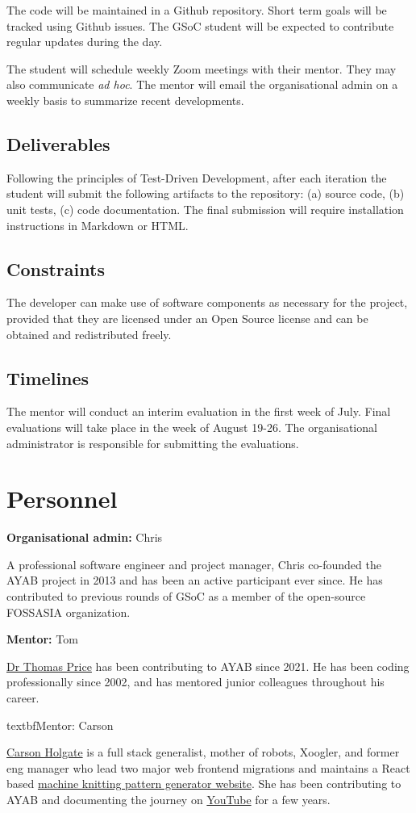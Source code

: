 \documentclass{article}
\begin{document}
The code will be maintained in a Github repository. Short term goals will be tracked using Github issues. The GSoC student will be expected to contribute regular updates during the day.

The student will schedule weekly Zoom meetings with their mentor. They may also communicate \textit{ad hoc}. The mentor will email the organisational admin on a weekly basis to summarize recent developments.

\subsection{Deliverables}
Following the principles of Test-Driven Development, after each iteration the student will submit the following artifacts to the repository: (a) source code, (b) unit tests, (c) code documentation. The final submission will require installation instructions in Markdown or HTML.

\subsection{Constraints}
The developer can make use of software components as necessary for the project, provided that they are licensed under an Open Source license and can be obtained and redistributed freely.

\subsection{Timelines}
The mentor will conduct an interim evaluation in the first week of July. Final evaluations will take place in the week of August 19-26. The organisational administrator is responsible for submitting the evaluations.


\section{Personnel}

\textbf{Organisational admin:} Chris

A professional software engineer and project manager, Chris co-founded the AYAB project in 2013 and has been an active participant ever since. He has contributed to previous rounds of GSoC as a member of the open-source FOSSASIA organization.

\textbf{Mentor:} Tom

\href{https://t0mpr1c3.github.io/}{Dr Thomas Price} has been contributing to AYAB since 2021. He has been coding professionally since 2002, and has mentored junior colleagues throughout his career.

textbf{Mentor:} Carson

\href{https://www.linkedin.com/in/carson-holgate/}{Carson Holgate} is a full stack generalist, mother of robots, Xoogler, and former eng manager who lead two major web frontend migrations and maintains a React based \href{https://www.abstractknitfactoryfactory.com/}{machine knitting pattern generator website}. She has been contributing to AYAB and documenting the journey on \href{https://www.youtube.com/channel/UCjSd0-rGqU2NPy_iSuCqUpw/}{YouTube} for a few years.
\end{document}
